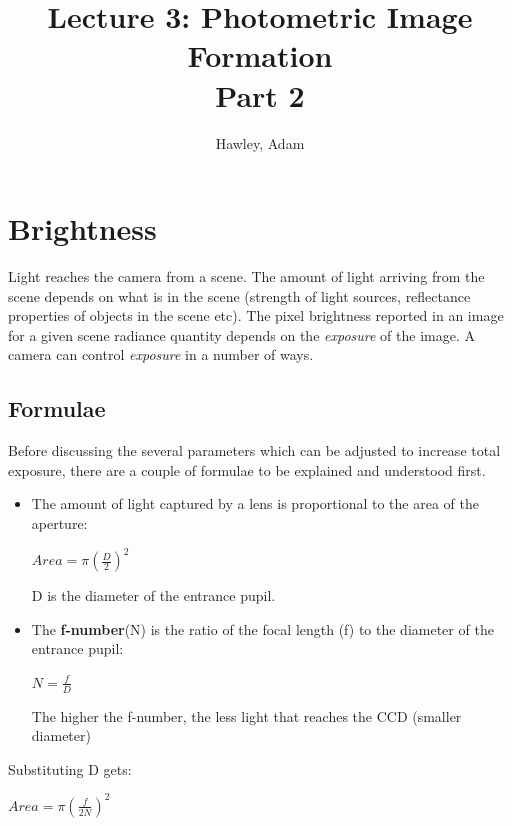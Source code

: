 \documentclass{article}
\begin{document}
\author{Hawley, Adam}
\title{Lecture 3: Photometric Image Formation\\Part 2}

\maketitle
\tableofcontents
\newpage

\section{Brightness}
Light reaches the camera from a scene. 
The amount of light arriving from the scene depends on what is in the scene (strength of light sources, reflectance properties of objects in the scene etc). 
The pixel brightness reported in an image for a given scene radiance quantity depends on the {\it exposure} of the image. 
A camera can control {\it exposure} in a number of ways.

\subsection{Formulae}
Before discussing the several parameters which can be adjusted to increase total exposure, there are a couple of formulae to be explained and understood first.

\begin{itemize}
	\item {The amount of light captured by a lens is proportional to the area of the aperture:

\centerline{$Area = \pi(\frac{D}{2})^2$}

D is the diameter of the entrance pupil.}

\item {The {\bf f-number}(N) is the ratio of the focal length (f) to the diameter of the entrance pupil:

\centerline{$N = \frac{f}{D}$}

The higher the f-number, the less light that reaches the CCD (smaller diameter)}

\end{itemize}

Substituting D gets:

\centerline{$Area = \pi (\frac{f}{2N})^2$}
\end{document}
